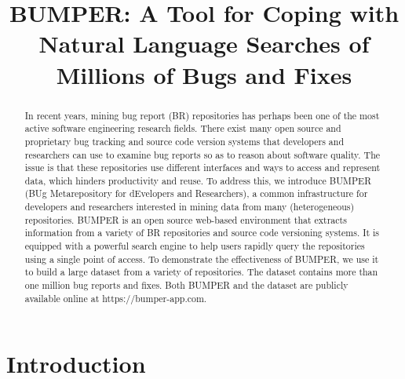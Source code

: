 \documentclass[conference]{IEEEtran}
\begin{document}
\title{BUMPER: A Tool for Coping with Natural Language Searches of Millions of Bugs and Fixes}


\author{
\and
{}
}

\maketitle

\begin{abstract}
  In recent years, mining bug report (BR) repositories has perhaps been one of the most active software engineering research fields. There exist many open source and proprietary bug tracking and source code version systems that developers and researchers can use to examine bug reports so as to reason about software quality. The issue is that these repositories use different interfaces and ways to access and represent data, which hinders productivity and reuse. To address this, we introduce BUMPER (BUg Metarepository for dEvelopers and Researchers), a common infrastructure for developers and researchers interested in mining data from many (heterogeneous) repositories. BUMPER is an open source web-based environment that extracts information from a variety of BR repositories and source code versioning systems. It is equipped with a powerful search engine to help users rapidly query the repositories using a single point of access. To demonstrate the effectiveness of BUMPER, we use it to build a large dataset from a variety of repositories. The dataset contains more than one million bug reports and fixes. Both BUMPER and the dataset are publicly available online at https://bumper-app.com.

\end{abstract}


\IEEEpeerreviewmaketitle


\section{Introduction}
\end{document}
